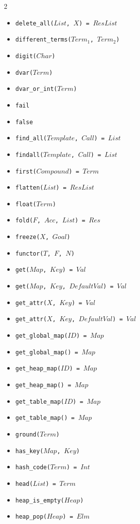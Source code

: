 \documentclass[10pt]{article}
\begin{document}
\begin{multicols}{2}
\begin{scriptsize}
\begin{itemize}
    \item \texttt{delete\_all($List$, $X$) = $ResList$}
    \item \texttt{different\_terms($Term_1$, $Term_2$)}
    \item \texttt{digit($Char$)}
    \item \texttt{dvar($Term$)}
    \item \texttt{dvar\_or\_int($Term$)}
    \item \texttt{fail}
    \item \texttt{false}
    \item \texttt{find\_all($Template$, $Call$) = $List$}
    \item \texttt{findall($Template$, $Call$) = $List$}
    \item \texttt{first($Compound$) = $Term$} 
    \item \texttt{flatten($List$) = $ResList$} 
    \item \texttt{float($Term$)} 
    \item \texttt{fold($F$, $Acc$, $List$) = $Res$} 
    \item \texttt{freeze($X$, $Goal$)}
    \item \texttt{functor($T$, $F$, $N$)}
    \item \texttt{get($Map$, $Key$) = $Val$}
    \item \texttt{get($Map$, $Key$, $DefaultVal$) = $Val$} 
    \item \texttt{get\_attr($X$, $Key$) = $Val$}
    \item \texttt{get\_attr($X$, $Key$, $DefaultVal$) = $Val$} 
    \item \texttt{get\_global\_map($ID$) = $Map$}
    \item \texttt{get\_global\_map() = $Map$}
    \item \texttt{get\_heap\_map($ID$) = $Map$} 
    \item \texttt{get\_heap\_map() = $Map$} 
    \item \texttt{get\_table\_map($ID$) = $Map$} 
    \item \texttt{get\_table\_map() = $Map$} 
    \item \texttt{ground($Term$)} 
    \item \texttt{has\_key($Map$, $Key$)} 
    \item \texttt{hash\_code($Term$) = $Int$} 
    \item \texttt{head($List$) = $Term$} 
    \item \texttt{heap\_is\_empty($Heap$)}
    \item \texttt{heap\_pop($Heap$) = $Elm$}

\end{itemize}
\end{scriptsize}
\end{multicols}
\end{document}
